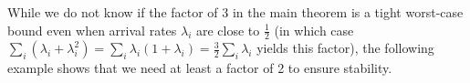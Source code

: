 




While we do not know if the factor of 3 in the main theorem is a tight worst-case bound even when arrival rates $\lambda_i$ are close to $\frac12$ (in which case $\sum_i (\lambda_i +\lambda_i^2)=\sum_i \lambda_i(1 +\lambda_i) = \frac{3}{2}\sum_i \lambda_i$ yields this factor), the following example shows that we need at least a factor of 2 to ensure stability. 

